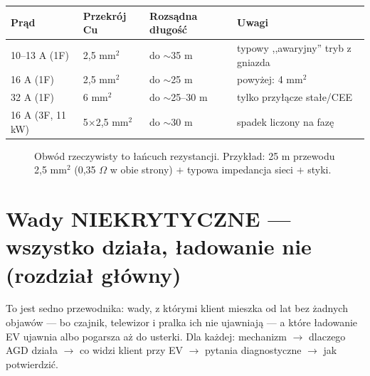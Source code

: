 \documentclass[11pt,a4paper]{article}
\newcommand{\ohm}{$\Omega$}
\begin{document}
\begin{longtable}{@{}p{}p{}p{}p{}@{}}
\toprule
\textbf{Prąd} & \textbf{Przekrój Cu} & \textbf{Rozsądna długość} & \textbf{Uwagi}\\
\midrule
10--13 A (1F) & 2,5 mm$^2$ & do $\sim$35 m & typowy ,,awaryjny'' tryb z gniazda\\
16 A (1F) & 2,5 mm$^2$ & do $\sim$25 m & powyżej: 4 mm$^2$\\
32 A (1F) & 6 mm$^2$ & do $\sim$25--30 m & tylko przyłącze stałe/CEE\\
16 A (3F, 11 kW) & 5$\times$2,5 mm$^2$ & do $\sim$30 m & spadek liczony na fazę\\
\bottomrule
\end{longtable}

\begin{figure}[h]
\centering
{}
\caption{Obwód rzeczywisty to łańcuch rezystancji. Przykład: 25 m przewodu 2,5 mm$^2$
(0,35 \ohm{} w obie strony) $+$ typowa impedancja sieci $+$ styki.}
\label{fig:spadek}
\end{figure}

\section{Wady NIEKRYTYCZNE --- wszystko działa, ładowanie nie (rozdział główny)}
\label{sec:niekrytyczne}
To jest sedno przewodnika: wady, z którymi klient mieszka od lat bez żadnych objawów --- bo czajnik,
telewizor i pralka ich nie ujawniają --- a które ładowanie EV ujawnia albo pogarsza aż do usterki.
Dla każdej: mechanizm $\to$ dlaczego AGD działa $\to$ co widzi klient przy EV $\to$ pytania
diagnostyczne $\to$ jak potwierdzić.
\end{document}
